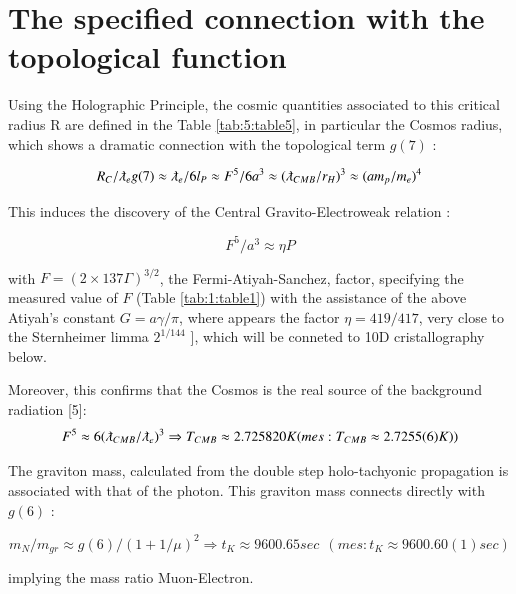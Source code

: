 \documentclass[a4paper,9pt]{article}
\begin{document}
\section{The specified connection with the topological function}

Using the Holographic Principle, the cosmic quantities associated to this critical radius R are defined in the Table \ref{tab:5:table5}, in particular the Cosmos radius, which shows a dramatic connection with the topological term $g(7)$ :

\begin{equation}
R_{C}/\lambdabar_{e} g(7) \approx  \lambdabar_{e}/6l_P \approx F^5/6a^3 \approx (\lambdabar_{CMB}/r_H)^3 \approx  (am_p/m_e)^4  
\end{equation}

This induces the discovery of the Central Gravito-Electroweak relation :

\begin{equation*}
F^5/a^3 \approx \eta P    
\end{equation*}{}
  

with  $F = (2\times 137 \Gamma)^{3/2}$, the Fermi-Atiyah-Sanchez, factor, specifying the measured value of  $F$ (Table \ref{tab:1:table1}) with the assistance of the above Atiyah's constant $G = a \gamma/ \pi$, where appears the factor $\eta = 419/417$, very close to the Sternheimer limma $2^{1/144}$ \cite{Sternheimer}], which will be conneted to 10D cristallography below.


Moreover, this confirms that the Cosmos is the real source of the background radiation [5]:
\begin{equation}
F^5  \approx 6(\lambdabar_{CMB}/\lambdabar_{e})^3 \Rightarrow  T_{CMB}  \approx  2.725820 K  (mes : T_{CMB}  \approx  2.7255(6) K)) 
\end{equation}


The graviton mass, calculated from the double step holo-tachyonic propagation is associated with that of the photon. This graviton mass connects directly with $g(6)$ :

\begin{equation}
m_N/m_{gr} \approx g(6)/(1+1/\mu)^2 \Rightarrow    t_K  \approx  9600.65 sec ~~(mes : t_K \approx 9600.60(1) sec)    
\end{equation}

implying the mass ratio Muon-Electron. 
\end{document}
